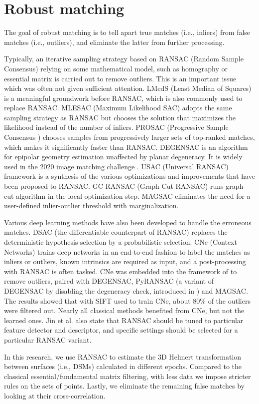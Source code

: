 \section{Robust matching}
The goal of robust matching is to tell apart true matches (i.e., inliers) from false matches (i.e., outliers), and eliminate the latter from further processing.
\par
Typically, an iterative sampling strategy based on RANSAC (Random Sample Consensus) \cite{fischler1981random} relying on some mathematical model, such as homography \cite{sonka2014image} or essential matrix \cite{sonka2014image} is carried out to remove outliers. 
This is an important issue which was often not given sufficient attention.
LMedS (Least Median of Squares) \cite{leroy1987robust} is a meaningful groundwork before RANSAC, which is also commonly used to replace RANSAC.
MLESAC (Maximum Likelihood SAC)  \cite{torr2000mlesac} adopts the same sampling strategy as RANSAC but chooses the solution that maximizes the likelihood instead of the number of inliers. PROSAC (Progressive Sample Consensus ) \cite{chum2005matching} chooses samples from progressively larger sets of top-ranked matches, which makes it significantly faster than RANSAC. DEGENSAC \cite{chum2005two} is an algorithm for epipolar geometry estimation unaffected by planar degeneracy. It is widely used in the 2020 image matching challenge \cite{imagematchingchallenge2020}.
USAC (Universal RANSAC) \cite{raguram2012usac} framework is a synthesis of the various optimizations and improvements that have been proposed to RANSAC.
GC-RANSAC (Graph-Cut RANSAC) \cite{barath2018graph} runs graph-cut algorithm in the local optimization step.
MAGSAC \cite{barath2019magsac} eliminates the need for a user-defined inlier-outlier threshold with marginalization.
\par
Various deep learning methods have also been developed to handle the erroneous matches.
DSAC (the differentiable counterpart of RANSAC) \cite{brachmann2017dsac} replaces the deterministic hypothesis selection by a probabilistic selection.
CNe (Context Networks) \cite{moo2018learning} trains deep networks in an end-to-end fashion to label the matches as inliers or outliers, known intrinsics are required as input, and a post-processing with RANSAC is often tasked. CNe was embedded into the framework of \cite{jin2020image} to remove outliers, paired with DEGENSAC, PyRANSAC (a variant of DEGENSAC by disabling the degeneracy check, introduced in \cite{jin2020image}) and MAGSAC. The results showed that with SIFT used to train CNe, about 80\% of the outliers were filtered out. Nearly all classical methods benefited from CNe, but not the learned ones. Jin et al. \cite{jin2020image} also state that RANSAC should be tuned to particular feature detector and descriptor, and specific settings should be selected for a particular RANSAC variant.
\par
In this research, we use RANSAC to estimate the 3D Helmert transformation between surfaces (i.e., \ac{DSM}s) calculated in different epochs. Compared to the classical essential/fundamental matrix filtering, with less data we impose stricter rules on the sets of points. Lastly, we eliminate the remaining false matches by looking at their cross-correlation.

